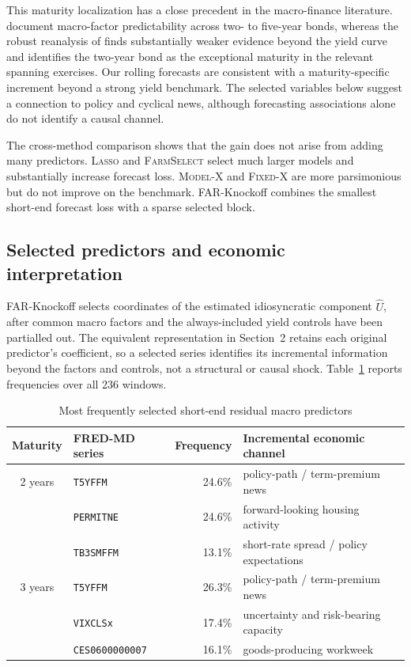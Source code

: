 This maturity localization has a close precedent in the macro-finance
literature. \citet{LudvigsonNg2009} document macro-factor predictability across
two- to five-year bonds, whereas the robust reanalysis of
\citet{BauerHamilton2018} finds substantially weaker evidence beyond the yield
curve and identifies the two-year bond as the exceptional maturity in the
relevant spanning exercises. Our rolling forecasts are consistent with a
maturity-specific increment beyond a strong yield benchmark. The selected
variables below suggest a connection to policy and cyclical news, although
forecasting associations alone do not identify a causal channel.

The cross-method comparison shows that the gain does not arise from adding many
predictors. \textsc{Lasso} and \textsc{FarmSelect} select much larger models
and substantially increase forecast loss. \textsc{Model-X} and
\textsc{Fixed-X} are more parsimonious but do not improve on the benchmark.
FAR-Knockoff combines the smallest short-end forecast loss with a sparse
selected block.

\subsection{Selected predictors and economic interpretation}
\label{sec:app_interpretation_v7}

FAR-Knockoff selects coordinates of the estimated idiosyncratic component
$\widehat U$, after common macro factors and the always-included yield controls
have been partialled out. The equivalent representation in Section~2 retains
each original predictor's coefficient, so a selected series identifies its
incremental information beyond the factors and controls, not a structural or
causal shock. Table~\ref{tab:empirical_selection_v7} reports frequencies over
all 236 windows.

\begin{table}[H]
\caption{Most frequently selected short-end residual macro predictors}
\label{tab:empirical_selection_v7}
\centering
\footnotesize
\setlength{\tabcolsep}{4.8pt}
\renewcommand{\arraystretch}{1.0}
\begin{tabular}{clrl}
\toprule
Maturity & FRED-MD series & Frequency & Incremental economic channel \\
\midrule
2 years & \texttt{T5YFFM} & 24.6\% & policy-path / term-premium news \\
        & \texttt{PERMITNE} & 24.6\% & forward-looking housing activity \\
        & \texttt{TB3SMFFM} & 13.1\% & short-rate spread / policy expectations \\
3 years & \texttt{T5YFFM} & 26.3\% & policy-path / term-premium news \\
        & \texttt{VIXCLSx} & 17.4\% & uncertainty and risk-bearing capacity \\
        & \texttt{CES0600000007} & 16.1\% & goods-producing workweek \\
\bottomrule
\end{tabular}
\end{table}

